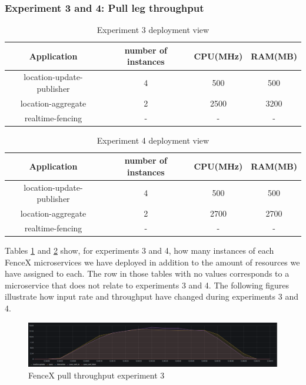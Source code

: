 \documentclass[a4]{report}
\begin{document}
    \subsubsection{Experiment 3 and 4: Pull leg throughput}
    \begin{table}[h!]
        \centering
        \begin{tabular}{|c|c|c|c|}
            \hline
            Application               & number of instances & CPU(MHz) & RAM(MB) \\
            \hline
            location-update-publisher & 4                   & 500      & 500     \\
            location-aggregate        & 2                   & 2500     & 3200    \\
            realtime-fencing          & -                   & -        & -       \\
            \hline
        \end{tabular}
        \caption{Experiment 3 deployment view}
        \label{table:ex3-dv}
    \end{table}

    \begin{table}[h!]
        \centering
        \begin{tabular}{|c|c|c|c|}
            \hline
            Application               & number of instances & CPU(MHz) & RAM(MB) \\
            \hline
            location-update-publisher & 4                   & 500      & 500     \\
            location-aggregate        & 2                   & 2700     & 2700    \\
            realtime-fencing          & -                   & -        & -       \\
            \hline
        \end{tabular}
        \caption{Experiment 4 deployment view}
        \label{table:ex4-dv}
    \end{table}


    Tables \ref{table:ex3-dv} and \ref{table:ex4-dv} show, for experiments 3 and 4, how many instances of each FenceX
    microservices we have deployed in addition to the amount of resources we have assigned to each.
    The row in those tables with no values corresponds to a microservice that does not relate to experiments 3
    and 4.
    The following figures illustrate how input rate and throughput have changed during experiments 3 and 4.

    \begin{figure}
        \caption{FenceX pull throughput experiment 3}
        \label{fig:ex3}
        \includegraphics[width=\textwidth, height=0.35\textheight]{images/evaluation/ex3-benchmarking(16,9).png}
    \end{figure}
\end{document}

